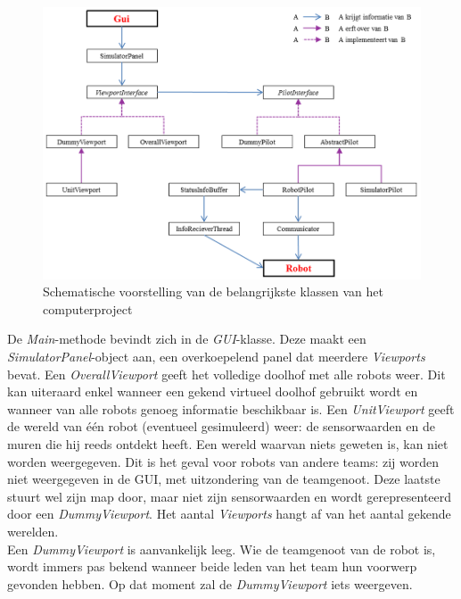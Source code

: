 \documentclass[eind]{penoverslag}
\begin{document}
\begin{figure}[h]
\centering
		\includegraphics[width=\textwidth]{KlasSoftware}
\caption[Structuur van computerproject]{Schematische voorstelling van de belangrijkste klassen van het computerproject}
\label{fig:klasSoft}
\end{figure}

De \textit{Main}-methode bevindt zich in de \textit{GUI}-klasse. Deze maakt een \textit{SimulatorPanel}-object aan, een overkoepelend panel dat meerdere \textit{Viewports} bevat. Een \textit{OverallViewport} geeft het volledige doolhof met alle robots weer. Dit kan uiteraard enkel wanneer een gekend virtueel doolhof gebruikt wordt en wanneer van alle robots genoeg informatie beschikbaar is. Een \textit{UnitViewport} geeft de wereld van \'e\'en robot (eventueel gesimuleerd) weer: de sensorwaarden en de muren die hij reeds ontdekt heeft. Een wereld waarvan niets geweten is, kan niet worden weergegeven. Dit is het geval voor robots van andere teams: zij worden niet weergegeven in de GUI, met uitzondering van de teamgenoot. Deze laatste stuurt wel zijn map door, maar niet zijn sensorwaarden en wordt gerepresenteerd door een \textit{DummyViewport}. Het aantal \textit{Viewports} hangt af van het aantal gekende werelden.\\

Een \textit{DummyViewport} is aanvankelijk leeg. Wie de teamgenoot van de robot is, wordt immers pas bekend wanneer beide leden van het team hun voorwerp gevonden hebben. Op dat moment zal de \textit{DummyViewport} iets weergeven.\\
\end{document}
